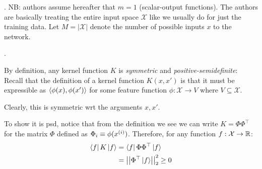 \documentclass{article}
\newcommand\mc{\mathcal}
\begin{document}
\begin{appendices}
. NB: authors assume hereafter that $m = 1$ (scalar-output functions). The authors are basically treating the entire input space $\mathcal X$ like we usually do for just the training data. Let $M = |\mathcal X|$ denote the number of possible inputs $x$ to the network.

. 



By definition, any kernel function $K$ is \textit{symmetric} and \textit{positive-semidefinite}: Recall that the definition of a kernel function $K(x, x')$ is that it must be expressible as $\left\langle \phi(x), \phi(x') \right\rangle$ for some feature function $\phi: \mc X \to V$ where $V \subseteq \mc X$.

\begin{compactenum}
	\item Clearly, this is symmetric wrt the arguments $x,x'$. 
	\item To show it is psd, notice that from the definition we see we can write $K = \Phi \Phi^\top$ for the matrix $\Phi$ defined as $\Phi_i \equiv \phi(\ival[i]{x})$. Therefore, for any function $f: \mc X \to\R$:
	\begin{align}
		\bra{f} K \ket{f}
		&= \bra{f} \Phi \Phi^\top \ket{f} \\
		&= \left|\left| \Phi^\top \ket{f} \right|\right|_{2}^2 
		\geq 0
	\end{align}
\end{compactenum} 





\end{appendices}
\end{document}
